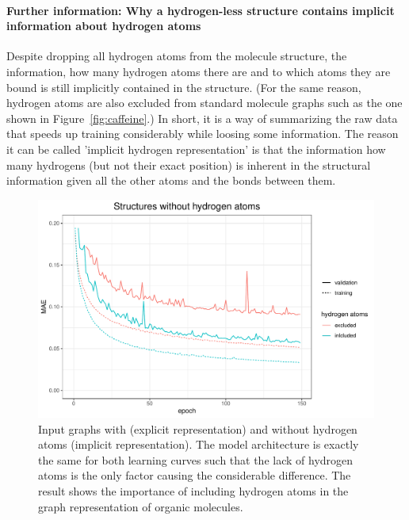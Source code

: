 \paragraph*{Further information: Why a hydrogen-less structure contains implicit information about hydrogen atoms}
Despite dropping all hydrogen atoms from the molecule structure, the information, how many hydrogen atoms there are and to which atoms they are bound is still implicitly contained in the structure. (For the same reason, hydrogen atoms are also excluded from standard molecule graphs such as the one shown in Figure~\ref{fig:caffeine}.) In short, it is a way of summarizing the raw data that speeds up training considerably while loosing some information. The reason it can be called 'implicit hydrogen representation' is that the information how many hydrogens (but not their exact position) is inherent in the structural information given all the other atoms and the bonds between them.

\begin{figure}[H]
	\includegraphics[width=\linewidth]{figures/implict-hydrogens.pdf}
	\caption{Input graphs with (explicit representation) and without hydrogen atoms (implicit representation). The model architecture is exactly the same for both learning curves such that the lack of hydrogen atoms is the only factor causing the considerable difference. The result shows the importance of including hydrogen atoms in the graph representation of organic molecules.}
	\label{fig:implicit-hydrogens}
\end{figure}

